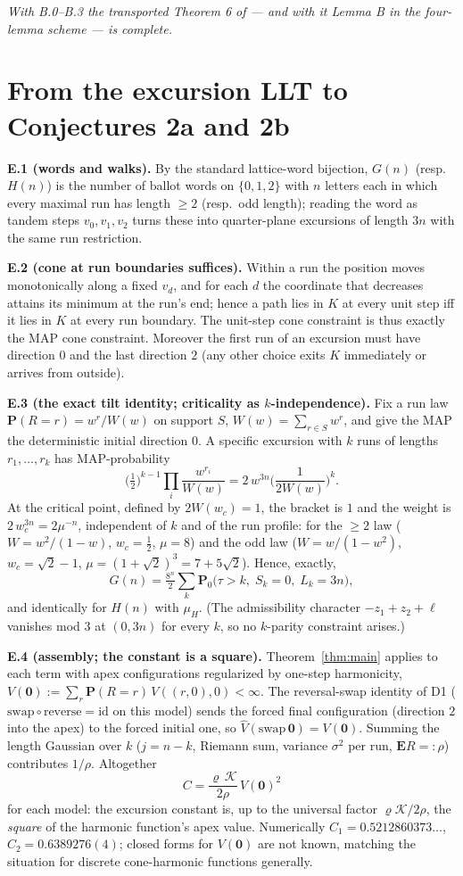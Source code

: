 \documentclass[11pt]{article}
\newcommand{\E}{\mathbf{E}}\newcommand{\Lat}{\mathcal{L}}\renewcommand{\Pr}{\mathbf{P}}
\begin{document}
\emph{With B.0--B.3 the transported Theorem 6 of \cite{DZ} --- and with it Lemma B in the
four-lemma scheme --- is complete.}

\section{From the excursion LLT to Conjectures 2a and 2b}
\textbf{E.1 (words and walks).} By the standard lattice-word bijection, $G(n)$ (resp.\
$H(n)$) is the number of ballot words on $\{0,1,2\}$ with $n$ letters each in which every
maximal run has length $\ge2$ (resp.\ odd length); reading the word as tandem steps
$v_0,v_1,v_2$ turns these into quarter-plane excursions of length $3n$ with the same run
restriction.

\textbf{E.2 (cone at run boundaries suffices).} Within a run the position moves
monotonically along a fixed $v_d$, and for each $d$ the coordinate that decreases attains
its minimum at the run's end; hence a path lies in $K$ at every unit step iff it lies in
$K$ at every run boundary. The unit-step cone constraint is thus exactly the MAP cone
constraint. Moreover the first run of an excursion must have direction $0$ and the last
direction $2$ (any other choice exits $K$ immediately or arrives from outside).

\textbf{E.3 (the exact tilt identity; criticality as $k$-independence).} Fix a run law
$\Pr(R=r)=w^r/W(w)$ on support $S$, $W(w)=\sum_{r\in S}w^r$, and give the MAP the
deterministic initial direction $0$. A specific excursion with $k$ runs of lengths
$r_1,\dots,r_k$ has MAP-probability
$$\Big(\tfrac12\Big)^{k-1}\prod_i\frac{w^{r_i}}{W(w)}
=2\,w^{3n}\Big(\frac{1}{2W(w)}\Big)^{k}.$$
At the critical point, defined by $2W(w_c)=1$, the bracket is $1$ and the weight is
$2\,w_c^{3n}=2\mu^{-n}$, independent of $k$ and of the run profile: for the $\ge2$ law
($W=w^2/(1-w)$, $w_c=\tfrac12$, $\mu=8$) and the odd law ($W=w/(1-w^2)$,
$w_c=\sqrt2-1$, $\mu=(1+\sqrt2)^3=7+5\sqrt2$). Hence, exactly,
$$G(n)=\tfrac{8^n}{2}\sum_k\Pr_0\big(\tau>k,\;S_k=0,\;L_k=3n\big),$$
and identically for $H(n)$ with $\mu_H$. (The admissibility character $-z_1+z_2+\ell$
vanishes mod $3$ at $(0,3n)$ for every $k$, so no $k$-parity constraint arises.)

\textbf{E.4 (assembly; the constant is a square).} Theorem~\ref{thm:main} applies to each
term with apex configurations regularized by one-step harmonicity,
$V(\mathbf0):=\sum_r\Pr(R=r)\,V((r,0),0)<\infty$. The reversal-swap identity of D1
($\mathrm{swap}\circ\mathrm{reverse}=\mathrm{id}$ on this model) sends the forced final
configuration (direction $2$ into the apex) to the forced initial one, so
$\widehat V(\mathrm{swap}\,\mathbf0)=V(\mathbf0)$. Summing the length Gaussian over $k$
($j=n-k$, Riemann sum, variance $\sigma^2$ per run, $\E R=:\rho$) contributes
$1/\rho$. Altogether
$$\boxed{\;C=\frac{\varrho\,\mathcal K}{2\rho}\,V(\mathbf0)^2\;}$$
for each model: the excursion constant is, up to the universal factor
$\varrho\mathcal K/2\rho$, the \emph{square} of the harmonic function's apex value.
Numerically $C_1=0.5212860373\ldots$, $C_2=0.6389276(4)$; closed forms for
$V(\mathbf0)$ are not known, matching the situation for discrete cone-harmonic functions
generally.
\end{document}
